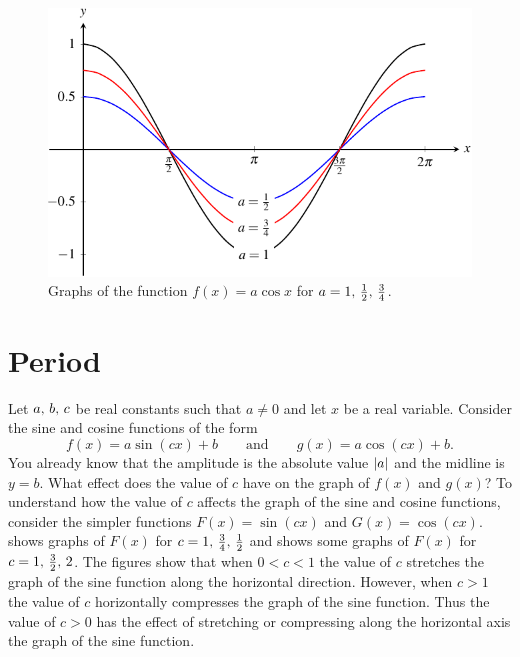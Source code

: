 \documentclass[a4paper,oneside,12pt]{article}
\begin{document}
{\begin{solution}
\begin{figure}[!htbp]
\centering
\includegraphics[scale=1.1]{image/13/cos-vertical-compress.pdf}
\caption{%
  Graphs of the function $f(x) = a \cos x$ for
  $a = {1},\, {\frac{1}{2}},\, {\frac{3}{4}}$.
}
\label{fig:trigonometric:cos_vertical_compress}
\end{figure}

\end{solution}
}{}



\section{Period}

Let ${a},\, {b},\, {c}$ be real constants such that $a \neq 0$ and let
$x$ be a real variable.  Consider the sine and cosine functions of the
form
\[
f(x)
=
a \sin(cx) + b
\qquad
\text{and}
\qquad
g(x)
=
a \cos(cx) + b.
\]
You already know that the amplitude is the absolute value
$\lvert a\rvert$ and the midline is $y = b$.  What effect does the
value of $c$ have on the graph of $f(x)$ and $g(x)$?  To understand
how the value of $c$ affects the graph of the sine and cosine
functions, consider the simpler functions $F(x) = \sin(cx)$ and
$G(x) = \cos(cx)$.
 shows graphs of
$F(x)$ for $c = {1},\, {\frac{3}{4}},\, {\frac{1}{2}}$ and
 shows some
graphs of $F(x)$ for $c = {1},\, {\frac{3}{2}},\, {2}$.  The figures
show that when $0 < c < 1$ the value of $c$ stretches the graph of the
sine function along the horizontal direction.  However, when $c > 1$
the value of $c$ horizontally compresses the graph of the sine
function.  Thus the value of $c > 0$ has the effect of stretching or
compressing along the horizontal axis the graph of the sine function.
\end{document}
